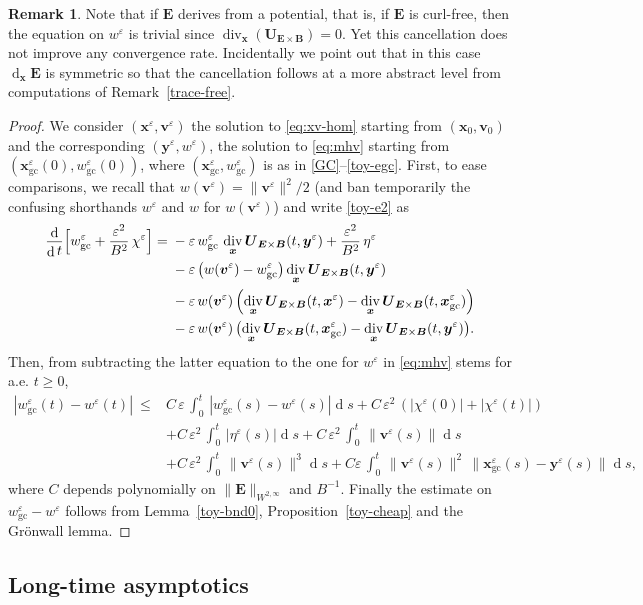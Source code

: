 \documentclass[10pt]{amsart}
\let\eps\varepsilon
\DeclareMathOperator\dD{d}\let\dd\dD
\DeclareMathOperator{\Div}{div}
\theoremstyle{plain}
\theoremstyle{definition}
\newtheorem{remark}[theorem]{Remark}
\newcommand\br{\begin{remark}}
\newcommand\er{\end{remark}}
\newcommand\bB{{\boldsymbol B}}
\newcommand\bE{{\boldsymbol E}}
\newcommand\bU{{\boldsymbol U}}
\newcommand\bfv{{\boldsymbol v}}
\newcommand\bfx{{\boldsymbol x}}
\newcommand\bfy{{\boldsymbol y}}
\let\e w
\newcommand{\GC}{\bfx_\mathrm{gc}}
\newcommand{\eGC}{w_\mathrm{gc}}
\newcommand{\EcB}{\bU_{\bE\times\bB}}
\begin{document}
\br
Note that if $\bE$ derives from a potential, that is, if $\bE$ is curl-free, then the equation on $\e^\eps$ is trivial since $\Div_\bfx (\EcB)=0$. Yet this cancellation does not improve any convergence rate. Incidentally we point out that in this case $\dD_\bfx\bE$ is symmetric so that the cancellation follows at a more abstract level from computations of Remark~\ref{trace-free}.
\er

\begin{proof}
We consider $(\bfx^\eps,\bfv^\eps)$ the solution to \eqref{eq:xv-hom} starting from $(\bfx_0,\bfv_0)$ and the corresponding $(\bfy^\eps,\e^\eps)$, the solution to \eqref{eq:mhv} starting from $(\GC^\eps(0),\eGC^\eps(0))$, where $(\GC^\eps,\eGC^\eps)$ is as in \eqref{GC}--\eqref{toy-egc}. First, to ease comparisons, we recall that \hbox{$\e(\bfv^\eps)=\|\bfv^\eps\|^2/2$} (and ban temporarily the confusing shorthands $\e^\eps$ and $\e$ for $\e(\bfv^\eps)$) and write \eqref{toy-e2} as
\begin{align*}
\frac{\dD}{\dD t}\Bigl[\eGC^\eps+\frac{\eps^2}{B^2}\,\chi^\eps\Bigr]
={}&-\eps\,\eGC^\eps\,\Div_\bfx\EcB(t,\bfy^\eps)+\frac{\eps^2}{B^2}\,\eta^\eps
\\
& -\eps\left(\e(\bfv^\eps)-\eGC^\eps\right)\Div_\bfx\EcB(t,\bfy^\eps)
\\
&-\eps\,\e(\bfv^\eps)\left(\Div_\bfx\EcB(t,\bfx^\eps)-\Div_\bfx\EcB(t,\GC^\eps)\right)
\\
&-\eps\,\e(\bfv^\eps)\,\bigl(\Div_\bfx\EcB(t,\GC^\eps)-\Div_\bfx\EcB(t,\bfy^\eps)\bigr).
\end{align*}
Then, from subtracting the latter equation to the one for $\e^\eps$ in \eqref{eq:mhv} stems for a.e. $t\geq0$,
\begin{align*}
|\eGC^\eps(t)-\e^\eps(t)|\
\leq{}&{}C\,\eps\,\int_0^t\,|\eGC^\eps(s)-\e^\eps(s)|\dD s
+C\,\eps^2\,\left(|\chi^\eps(0)|+|\chi^\eps(t)|\right)\\
&+C\,\eps^2\,\int_0^t\,|\eta^\eps(s)|\dD s
+C\,\eps^2\,\int_0^t\,\|\bfv^\eps(s)\|\dD s\\
&+C\,\eps^2\,\int_0^t\,\|\bfv^\eps(s)\|^3\dD s
+C\eps\,\int_0^t\,\|\bfv^\eps(s)\|^2\,\|\GC^\eps(s)-\bfy^\eps(s)\|\dD s,
\end{align*}
where $C$ depends polynomially on $\|\bE\|_{W^{2,\infty}}$ and $B^{-1}$. Finally the estimate on $\eGC^\eps-\e^\eps$ follows from Lemma~\ref{toy-bnd0}, Proposition~\ref{toy-cheap} and the Grönwall lemma.
\end{proof}

\subsection{Long-time asymptotics}
\label{s:toy-long}
\end{document}

